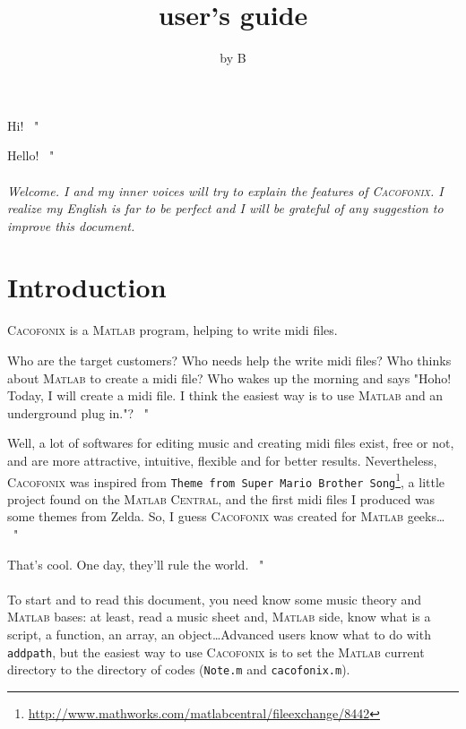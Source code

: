 \documentclass{article}
\title{\cacofonix user's guide}
\author{by B}
\date{}
\newcommand\cacofonix{\textsc{Cacofonix}\xspace}
\newcommand\matlab{\textsc{Matlab}\xspace}
\newcommand\noteFile{\texttt{Note.m}\xspace}
\newcommand\cacofonixFile{\texttt{cacofonix.m}\xspace}
\newcommand\exchange[2]{\texttt{#1}\footnote{\url{#2}}\xspace}
\newenvironment{meenv}{ \par \noindent \makebox[6em][r]{ \textcolor{mecolor}{Me}: " --~}}{~"}
\newenvironment{myselfenv}{ \par \noindent \makebox[6em][r]{ \textcolor{myselfcolor}{Myself}: " --~}}{~"}
\newcommand{ \me }[1]{%
\begin{meenv}%
	#1%
\end{meenv} }
\newcommand{ \myself }[1]{%
\begin{myselfenv}%
	#1%
\end{myselfenv} }
\begin{document}
\maketitle

\me{Hi!}
\myself{Hello!}

\paragraph{}

\emph{Welcome. I and my inner voices will try to explain the features of \cacofonix. I realize my English is far to be perfect and I will be grateful of any suggestion to improve this document.}

\tableofcontents

\section{Introduction}

\cacofonix is a \matlab program, helping to write midi files.

\me{Who are the target customers? Who needs help the write midi files? Who thinks about \matlab to create a midi file? Who wakes up the morning and says "Hoho! Today, I will create a midi file. I think the easiest way is to use \matlab and an underground plug in."?}
\myself{Well, a lot of softwares for editing music and creating midi files exist, free or not, and are more attractive, intuitive, flexible and for better results. Nevertheless, \cacofonix was inspired from \exchange{Theme from Super Mario Brother Song}{http://www.mathworks.com/matlabcentral/fileexchange/8442}, a little project found on the \textsc{Matlab Central}, and the first midi files I produced was some themes from Zelda. So, I guess \cacofonix was created for \matlab geeks\dots}
\me{That's cool. One day, they'll rule the world.}

\paragraph{}

To start and to read this document, you need know some music theory and \matlab bases: at least, read a music sheet and, \matlab side, know what is a script, a function, an array, an object\dots Advanced users know what to do with \lstinline!addpath!, but the easiest way to use \cacofonix is to set the \matlab current directory to the directory of codes (\noteFile and \cacofonixFile).
\end{document}
